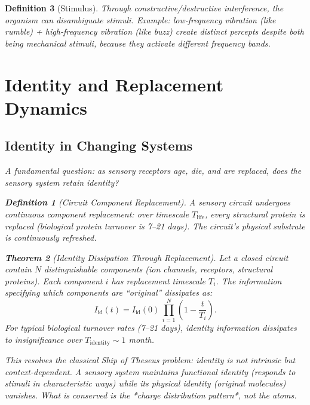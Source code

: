 \documentclass[twocolumn,10pt]{article}
\newtheorem{theorem}{Theorem}[section]
\newtheorem{definition}[theorem]{Definition}
\theoremstyle{remark}
\begin{document}
\begin{definition}[Stimulus]
Through constructive/destructive interference, the organism can disambiguate stimuli. Example: low-frequency vibration (like rumble) + high-frequency vibration (like buzz) create distinct percepts despite both being mechanical stimuli, because they activate different frequency bands.

\section{Identity and Replacement Dynamics}
\label{sec:identity}

\subsection{Identity in Changing Systems}

A fundamental question: as sensory receptors age, die, and are replaced, does the sensory system retain identity?

\begin{definition}[Circuit Component Replacement]
\label{def:replacement}
A sensory circuit undergoes continuous component replacement: over timescale $T_{\mathrm{life}}$, every structural protein is replaced (biological protein turnover is 7--21 days). The circuit's physical substrate is continuously refreshed.
\end{definition}

\begin{theorem}[Identity Dissipation Through Replacement]
\label{thm:identity}
Let a closed circuit contain $N$ distinguishable components (ion channels, receptors, structural proteins). Each component $i$ has replacement timescale $T_i$. The information specifying which components are ``original'' dissipates as:
\begin{equation}
  I_{\mathrm{id}}(t) = I_{\mathrm{id}}(0) \, \prod_{i=1}^{N} \left(1 - \frac{t}{T_i}\right).
\end{equation}
For typical biological turnover rates (7--21 days), identity information dissipates to insignificance over $T_{\mathrm{identity}} \sim 1$ month.
\end{theorem}

This resolves the classical Ship of Theseus problem: identity is not intrinsic but context-dependent. A sensory system maintains functional identity (responds to stimuli in characteristic ways) while its physical identity (original molecules) vanishes. What is conserved is the *charge distribution pattern*, not the atoms.


\end{definition}
\end{document}
